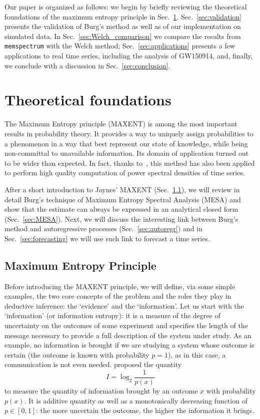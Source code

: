 \documentclass{aa}
\begin{document}
Our paper is organized as follows: we begin by briefly reviewing the theoretical foundations of the maximum entropy principle in Sec.~\ref{sec:foundations}. Sec.~\ref{sec:validation} presents the validation of Burg's method as well as of our implementation on simulated data. In Sec.~\ref{sec:Welch_comparison} we compare the results from \texttt{memspectrum} with the Welch method; Sec.~\ref{sec:applications} presents a few applications to real time series, including the analysis of GW150914, and, finally, we conclude with a discussion in Sec.~\ref{sec:conclusion}.


\section{Theoretical foundations}\label{sec:foundations}
The Maximum Entropy principle (MAXENT) is among the most important results in probability theory. It provides a way to uniquely assign probabilities to a phenomenon in a way that best represent our state of knowledge, while being non-committal to unavailable information. Its domain of application turned out to be wider than expected. In fact, thanks to~\citet{burg1975maximum}, this method has also been applied to perform high quality computation of power spectral densities of time series.

After a short introduction to Jaynes' MAXENT (Sec.~\ref{sec:MAXENT}), we will review in detail Burg's technique of Maximum Entropy Spectral Analysis (MESA) and show that the estimate can always be expressed in an analytical closed form (Sec.~\ref{sec:MESA}).
Next, we will discuss the interesting link between Burg's method and autoregressive processes (Sec.~\ref{sec:autoregr}) and in Sec.~\ref{sec:forecasting} we will use such link to forecast a time series.

\subsection{Maximum Entropy Principle} \label{sec:MAXENT}

Before introducing the MAXENT principle, we will define, via some simple examples, the two core concepts of the problem and the roles they play in deductive inference: the `evidence' and the `information'.
Let us start with the `information' (or information entropy): it is a measure of the degree of uncertainty on the outcomes of some experiment and specifies the length of the message necessary to provide a full description of the system under study. As an example, no information is brought if we are studying a system whose outcome is certain (the outcome is known with probability $p = 1$), as in this case, a communication is not even needed.
\citet{Shannon} proposed the quantity
\begin{equation}\label{eq:information}
    I = \log_2 \frac{1}{p(x)}
\end{equation}
to measure the quantity of information brought by an outcome $x$ with probability $p(x)$. It is additive quantity as well as a monotonically decreasing function of $p \in [0, 1]$: the more uncertain the outcome, the higher the information it brings.
\end{document}
